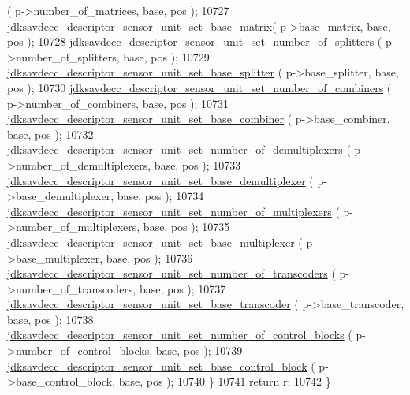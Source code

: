 \begin{DoxyCode}
      ( p->number\_of\_matrices, base, pos );
10727         \hyperlink{group__descriptor__sensor_gaf06a1fe2ebe79ff0297cc6bdc444fb56}{jdksavdecc\_descriptor\_sensor\_unit\_set\_base\_matrix}(
       p->base\_matrix, base, pos );
10728         \hyperlink{group__descriptor__sensor_ga732e1b4190ee1d05e6f9a894030982b2}{jdksavdecc\_descriptor\_sensor\_unit\_set\_number\_of\_splitters}
      ( p->number\_of\_splitters, base, pos );
10729         \hyperlink{group__descriptor__sensor_ga50d9f571b2e3b8f6a42c1c031e1e49d5}{jdksavdecc\_descriptor\_sensor\_unit\_set\_base\_splitter}
      ( p->base\_splitter, base, pos );
10730         \hyperlink{group__descriptor__sensor_ga89b32eb2b01cfef0bdc677619838edb1}{jdksavdecc\_descriptor\_sensor\_unit\_set\_number\_of\_combiners}
      ( p->number\_of\_combiners, base, pos );
10731         \hyperlink{group__descriptor__sensor_gaba01d362ce2850a89464aea2de9e1880}{jdksavdecc\_descriptor\_sensor\_unit\_set\_base\_combiner}
      ( p->base\_combiner, base, pos );
10732         \hyperlink{group__descriptor__sensor_ga8fd246a13151d4baea210d8a168a908b}{jdksavdecc\_descriptor\_sensor\_unit\_set\_number\_of\_demultiplexers}
      ( p->number\_of\_demultiplexers, base, pos );
10733         \hyperlink{group__descriptor__sensor_ga618ca6606296384e01b25ffb2004c3c9}{jdksavdecc\_descriptor\_sensor\_unit\_set\_base\_demultiplexer}
      ( p->base\_demultiplexer, base, pos );
10734         \hyperlink{group__descriptor__sensor_ga8d851e7d93a4ed65485595e112071c0e}{jdksavdecc\_descriptor\_sensor\_unit\_set\_number\_of\_multiplexers}
      ( p->number\_of\_multiplexers, base, pos );
10735         \hyperlink{group__descriptor__sensor_gacc1a2b6c41bc416766e84fdca64c7dc4}{jdksavdecc\_descriptor\_sensor\_unit\_set\_base\_multiplexer}
      ( p->base\_multiplexer, base, pos );
10736         \hyperlink{group__descriptor__sensor_gae95fc5d48fb2b22a20cf991b9546a975}{jdksavdecc\_descriptor\_sensor\_unit\_set\_number\_of\_transcoders}
      ( p->number\_of\_transcoders, base, pos );
10737         \hyperlink{group__descriptor__sensor_ga2ffdc6d6d6964e16f6d3f529f51771e8}{jdksavdecc\_descriptor\_sensor\_unit\_set\_base\_transcoder}
      ( p->base\_transcoder, base, pos );
10738         \hyperlink{group__descriptor__sensor_ga51eaf09acad54c56388065f5e3da6417}{jdksavdecc\_descriptor\_sensor\_unit\_set\_number\_of\_control\_blocks}
      ( p->number\_of\_control\_blocks, base, pos );
10739         \hyperlink{group__descriptor__sensor_gaf6e357e564a8d89324eba56d82886fd1}{jdksavdecc\_descriptor\_sensor\_unit\_set\_base\_control\_block}
      ( p->base\_control\_block, base, pos );
10740     \}
10741     \textcolor{keywordflow}{return} r;
10742 \}
\end{DoxyCode}



